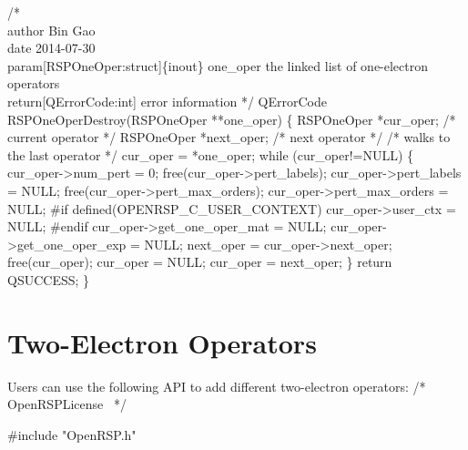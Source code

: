 /*%
    \\author Bin Gao
    \\date 2014-07-30
    \\param[RSPOneOper:struct]\{inout\} one_oper the linked list of one-electron operators
    \\return[QErrorCode:int] error information
*/
QErrorCode RSPOneOperDestroy(RSPOneOper **one_oper)
\{
    RSPOneOper *cur_oper;   /* current operator */
    RSPOneOper *next_oper;  /* next operator */
    /* walks to the last operator */
    cur_oper = *one_oper;
    while (cur_oper!=NULL) \{
        cur_oper->num_pert = 0;
        free(cur_oper->pert_labels);
        cur_oper->pert_labels = NULL;
        free(cur_oper->pert_max_orders);
        cur_oper->pert_max_orders = NULL;
#if defined(OPENRSP_C_USER_CONTEXT)
        cur_oper->user_ctx = NULL;
#endif
        cur_oper->get_one_oper_mat = NULL;
        cur_oper->get_one_oper_exp = NULL;
        next_oper = cur_oper->next_oper;
        free(cur_oper);
        cur_oper = NULL;
        cur_oper = next_oper;
    \}
    return QSUCCESS;
\}

\nwendcode{}\section{Two-Electron Operators}
\label{section-OpenRSP-TwoOper}

Users can use the following API to add different two-electron operators:
\nwenddocs{}\endmoddef
/*
  \LA{}OpenRSPLicense~{\nwtagstyle{}}\RA{}
*/

#include "OpenRSP.h"

